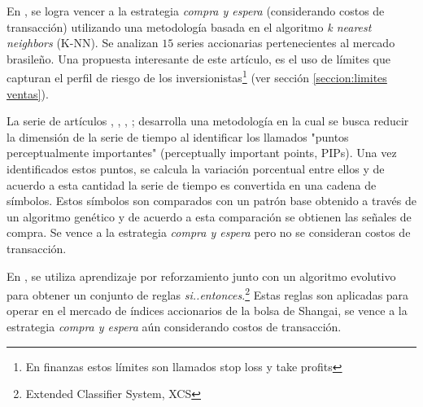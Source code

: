 \documentclass[12pt]{report}
\theoremstyle{break}
\theoremstyle{break}
\begin{document}
En \cite{Teixeira2010}, se logra vencer a la estrategia \textit{compra y espera} (considerando costos de transacción) utilizando una metodología basada en el algoritmo \textit{k nearest neighbors} (K-NN). Se analizan $15$ series accionarias pertenecientes al mercado brasileño. Una propuesta interesante de este artículo, es el uso de límites que capturan el perfil de riesgo de los inversionistas\footnote{En finanzas estos límites son llamados stop loss y take profits} (ver sección \ref{seccion:limites ventas}).

La serie de artículos \cite{Canelas2012-gecco}, \cite{Canelas2013-gecco}, \cite{Canelas2013-journal}, \cite{Leitao2016}; desarrolla una metodología en la cual se busca reducir la dimensión de la serie de tiempo al identificar los llamados "puntos perceptualmente importantes" (perceptually important points, PIPs). Una vez identificados estos puntos, se calcula la variación porcentual entre ellos y de acuerdo a esta cantidad la serie de tiempo es convertida en una cadena de símbolos. Estos símbolos son comparados con un patrón base obtenido a través de un algoritmo genético y de acuerdo a esta comparación se obtienen las señales de compra. Se vence a la estrategia \textit{compra y espera} pero no se consideran costos de transacción.

En \cite{Hu2015-XCS}, se utiliza aprendizaje por reforzamiento junto con un algoritmo evolutivo para obtener un conjunto de reglas \textit{si..entonces}.\footnote{Extended Classifier System, XCS} Estas reglas son aplicadas para operar en el mercado de índices accionarios de la bolsa de Shangai, se vence a la estrategia \textit{compra y espera} aún considerando costos de transacción.
\end{document}
